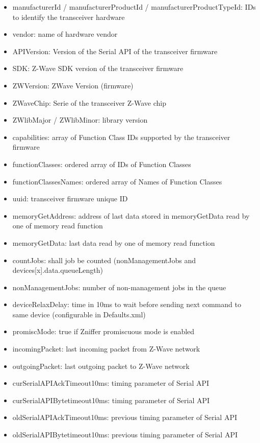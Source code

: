 \begin {itemize}
\begin {itemize}
\begin {itemize}
\item  manufacturerId / manufacturerProductId / manufacturerProductTypeId: IDs to identify the transceiver hardware
\item  vendor: name of hardware vendor
\item  APIVersion: Version of the Serial API of the transceiver firmware
\item  SDK: Z-Wave SDK version of the transceiver firmware
\item  ZWVersion: ZWave Version (firmware)
\item  ZWaveChip: Serie of the transceiver Z-Wave chip
\item  ZWlibMajor / ZWlibMinor: library version 
\item  capabilities: array of Function Class IDs supported by the transceiver firmware
\item  functionClasses: ordered array of IDs of Function Classes
\item  functionClassesNames: ordered array of Names of Function Classes
\item  uuid: \zway transceiver firmware unique ID

\item  memoryGetAddress: address of last data stored in memoryGetData read by one of memory read function
\item  memoryGetData: last data read by one of memory read function
\item  countJobs: shall job be counted (nonManagementJobs and devices[x].data.queueLength)
\item  nonManagementJobs: number of non-management jobs in the queue
\item  deviceRelaxDelay: time in 10ms to wait before sending next command to same device (configurable in Defaults.xml)
\item  promiscMode: true if Zniffer promiscuous mode is enabled
\item  incomingPacket: last incoming packet from Z-Wave network
\item  outgoingPacket: last outgoing packet to Z-Wave network

\item  curSerialAPIAckTimeout10ms: timing parameter of Serial API
\item  curSerialAPIBytetimeout10ms: timing parameter of Serial API
\item  oldSerialAPIAckTimeout10ms: previous timing parameter of Serial API
\item  oldSerialAPIBytetimeout10ms: previous timing parameter of Serial API
\end {itemize}

\end {itemize}
\end {itemize}

